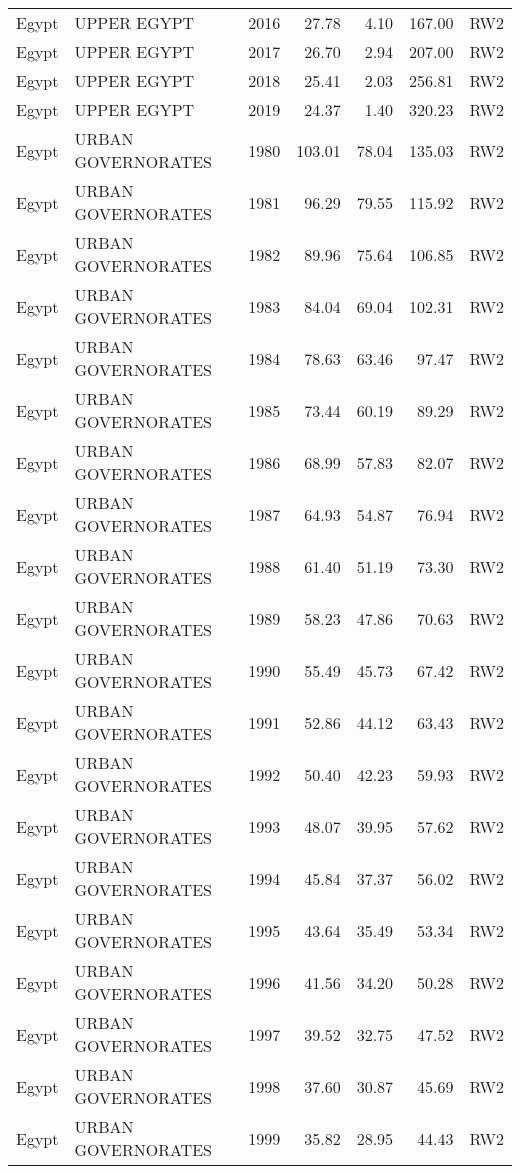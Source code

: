 \begin{longtable}{lllrrrl}
  Egypt & UPPER EGYPT & 2016 & 27.78 & 4.10 & 167.00 & RW2 \\ 
  Egypt & UPPER EGYPT & 2017 & 26.70 & 2.94 & 207.00 & RW2 \\ 
  Egypt & UPPER EGYPT & 2018 & 25.41 & 2.03 & 256.81 & RW2 \\ 
  Egypt & UPPER EGYPT & 2019 & 24.37 & 1.40 & 320.23 & RW2 \\ 
  Egypt & URBAN GOVERNORATES & 1980 & 103.01 & 78.04 & 135.03 & RW2 \\ 
  Egypt & URBAN GOVERNORATES & 1981 & 96.29 & 79.55 & 115.92 & RW2 \\ 
  Egypt & URBAN GOVERNORATES & 1982 & 89.96 & 75.64 & 106.85 & RW2 \\ 
  Egypt & URBAN GOVERNORATES & 1983 & 84.04 & 69.04 & 102.31 & RW2 \\ 
  Egypt & URBAN GOVERNORATES & 1984 & 78.63 & 63.46 & 97.47 & RW2 \\ 
  Egypt & URBAN GOVERNORATES & 1985 & 73.44 & 60.19 & 89.29 & RW2 \\ 
  Egypt & URBAN GOVERNORATES & 1986 & 68.99 & 57.83 & 82.07 & RW2 \\ 
  Egypt & URBAN GOVERNORATES & 1987 & 64.93 & 54.87 & 76.94 & RW2 \\ 
  Egypt & URBAN GOVERNORATES & 1988 & 61.40 & 51.19 & 73.30 & RW2 \\ 
  Egypt & URBAN GOVERNORATES & 1989 & 58.23 & 47.86 & 70.63 & RW2 \\ 
  Egypt & URBAN GOVERNORATES & 1990 & 55.49 & 45.73 & 67.42 & RW2 \\ 
  Egypt & URBAN GOVERNORATES & 1991 & 52.86 & 44.12 & 63.43 & RW2 \\ 
  Egypt & URBAN GOVERNORATES & 1992 & 50.40 & 42.23 & 59.93 & RW2 \\ 
  Egypt & URBAN GOVERNORATES & 1993 & 48.07 & 39.95 & 57.62 & RW2 \\ 
  Egypt & URBAN GOVERNORATES & 1994 & 45.84 & 37.37 & 56.02 & RW2 \\ 
  Egypt & URBAN GOVERNORATES & 1995 & 43.64 & 35.49 & 53.34 & RW2 \\ 
  Egypt & URBAN GOVERNORATES & 1996 & 41.56 & 34.20 & 50.28 & RW2 \\ 
  Egypt & URBAN GOVERNORATES & 1997 & 39.52 & 32.75 & 47.52 & RW2 \\ 
  Egypt & URBAN GOVERNORATES & 1998 & 37.60 & 30.87 & 45.69 & RW2 \\ 
  Egypt & URBAN GOVERNORATES & 1999 & 35.82 & 28.95 & 44.43 & RW2 \\ 

\end{longtable}
